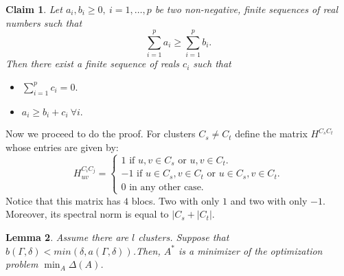 \documentclass[12pt]{amsart}
\newtheorem{lemma}{Lemma}[section]
\newtheorem{claim}[lemma]{Claim}
\theoremstyle{remark}
\begin{document}
\begin{claim}
Let $a_i,b_i \geq 0, \ i = 1,\dots,p$ be two non-negative, finite sequences of real numbers such that
\[
\sum_{i=1}^{p}a_i \geq \sum_{i=1}^{p}b_i.
\]
Then there exist a finite sequence of reals $c_i$ such that
\begin{itemize}
\item $\sum_{i=1}^p c_i=0.$
\item $a_i \geq b_i+c_i \  \forall i.$
\end{itemize}
\end{claim}


Now we proceed to do the proof. For  clusters $C_s\neq C_t$ define the matrix $H^{C_sC_t}$ whose entries are given by: 
\[
H^{C_iC_j}_{uv}= 
\begin{cases}
1 \text{ if } u,v \in C_s \text{ or } u,v \in C_t. \\
-1 \text{ if } u \in C_s, v \in C_t \text{ or } u \in C_s, v\in C_t. \\
0 \text{ in any other case.}
\end{cases}
\]
Notice that this matrix has $4$ blocs. Two with only $1$ and two with only $-1$. Moreover, its spectral norm is equal to $|C_s+|C_t|$.

\begin{lemma}\label{lemma: transport2}
Assume there are $l$ clusters. Suppose that $ b(\Gamma,\delta) < min(\delta,a(\Gamma,\delta))$.Then,
$A^*$ is a minimizer of the optimization problem $\min_A\Delta(A)$. 
\end{lemma}
\end{document}

